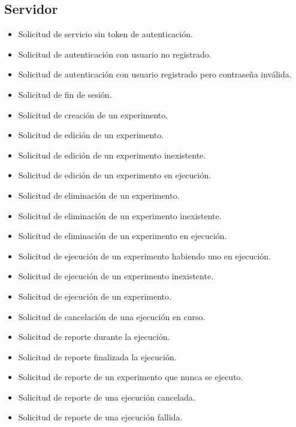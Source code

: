 \subsection{Servidor}
\begin{itemize}
\item Solicitud de servicio sin token de autenticaci\'on.
\item Solicitud de autenticaci\'on con usuario no registrado.
\item Solicitud de autenticaci\'on con usuario registrado pero contrase\~na inv\'alida.
\item Solicitud de fin de sesi\'on.
\item Solicitud de creaci\'on de un experimento.
\item Solicitud de edici\'on de un experimento.
\item Solicitud de edici\'on de un experimento inexistente.
\item Solicitud de edici\'on de un experimento en ejecuci\'on.
\item Solicitud de eliminaci\'on de un experimento.
\item Solicitud de eliminaci\'on de un experimento inexistente.
\item Solicitud de eliminaci\'on de un experimento en ejecuci\'on.
\item Solicitud de ejecuci\'on de un experimento habiendo uno en ejecuci\'on.
\item Solicitud de ejecuci\'on de un experimento inexistente.
\item Solicitud de ejecuci\'on de un experimento.
\item Solicitud de cancelaci\'on de una ejecuci\'on en curso.
\item Solicitud de reporte durante la ejecuci\'on.
\item Solicitud de reporte finalizada la ejecuci\'on.
\item Solicitud de reporte de un experimento que nunca se ejecuto.
\item Solicitud de reporte de una ejecuci\'on cancelada.
\item Solicitud de reporte de una ejecuci\'on fallida.
\end{itemize}

